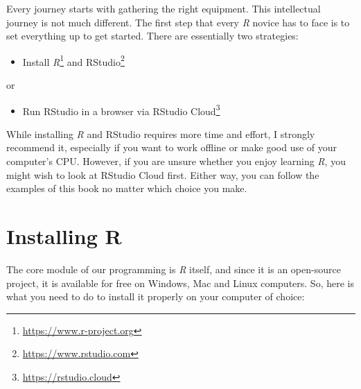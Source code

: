 \documentclass[
  letterpaper,
]{krantz}
\providecommand{\tightlist}{%
  \setlength{\itemsep}{0pt}\setlength{\parskip}{0pt}}\usepackage{longtable,booktabs,array}
\renewcommand{\href}[2]{#2\footnote{\url{#1}}}
\begin{document}
Every journey starts with gathering the right equipment. This
intellectual journey is not much different. The first step that every
\emph{R} novice has to face is to set everything up to get started.
There are essentially two strategies:

\begin{itemize}
\tightlist
\item
  Install \href{https://www.r-project.org}{\emph{R}} and
  \href{https://www.rstudio.com}{RStudio}
\end{itemize}

or

\begin{itemize}
\tightlist
\item
  Run RStudio in a browser via \href{https://rstudio.cloud}{RStudio
  Cloud}
\end{itemize}

While installing \emph{R} and RStudio requires more time and effort, I
strongly recommend it, especially if you want to work offline or make
good use of your computer's CPU. However, if you are unsure whether you
enjoy learning \emph{R}, you might wish to look at RStudio Cloud first.
Either way, you can follow the examples of this book no matter which
choice you make.

\section{Installing R}\label{installing-r}

The core module of our programming is \emph{R} itself, and since it is
an open-source project, it is available for free on Windows, Mac and
Linux computers. So, here is what you need to do to install it properly
on your computer of choice:
\end{document}
